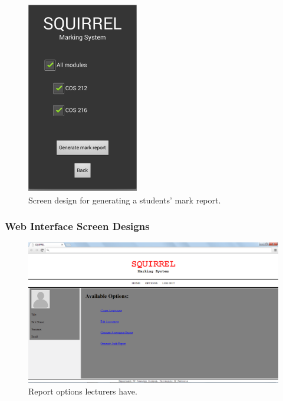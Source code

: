 \documentclass[11pt,a4paper]{article}
\begin{document}
	\begin{figure}[h]
	\centering
	\includegraphics[width=0.7\linewidth]{./mobile_studentReport}
	\caption{Screen design for generating a students' mark report. }
	\label{fig:mobile_studentReport}
	\end{figure}	
\pagebreak	
\subsubsection{Web Interface Screen Designs}
\begin{figure}[h!]
\centering
\includegraphics[width=1.0\linewidth]{./web_lecturerOptions}
\caption{Report options lecturers have.}
\label{fig:web_lecturerOptions}
\end{figure}
\end{document}
